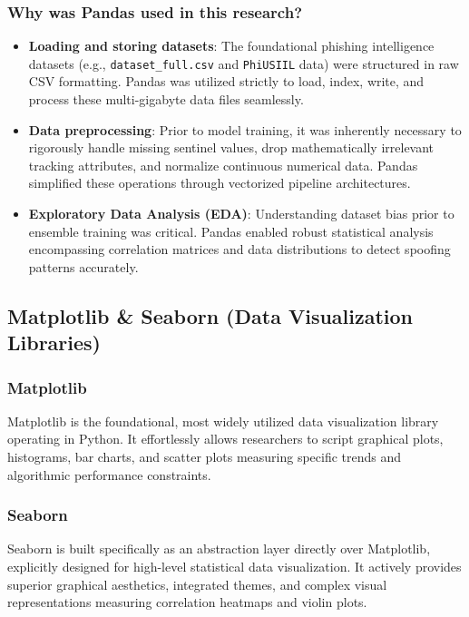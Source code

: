 \subsubsection*{Why was Pandas used in this research?}
\begin{itemize}
\item \textbf{Loading and storing datasets}: The foundational phishing intelligence datasets (e.g., \texttt{dataset\_full.csv} and \texttt{PhiUSIIL} data) were structured in raw CSV formatting. Pandas was utilized strictly to load, index, write, and process these multi-gigabyte data files seamlessly.
\item \textbf{Data preprocessing}: Prior to model training, it was inherently necessary to rigorously handle missing sentinel values, drop mathematically irrelevant tracking attributes, and normalize continuous numerical data. Pandas simplified these operations through vectorized pipeline architectures.
\item \textbf{Exploratory Data Analysis (EDA)}: Understanding dataset bias prior to ensemble training was critical. Pandas enabled robust statistical analysis encompassing correlation matrices and data distributions to detect spoofing patterns accurately.
\end{itemize}

\subsection{Matplotlib \& Seaborn (Data Visualization Libraries)}
\noindent
\subsubsection*{Matplotlib}

\noindent
Matplotlib is the foundational, most widely utilized data visualization library operating in Python. It effortlessly allows researchers to script graphical plots, histograms, bar charts, and scatter plots measuring specific trends and algorithmic performance constraints.

\subsubsection*{Seaborn}

\noindent
Seaborn is built specifically as an abstraction layer directly over Matplotlib, explicitly designed for high-level statistical data visualization. It actively provides superior graphical aesthetics, integrated themes, and complex visual representations measuring correlation heatmaps and violin plots.

